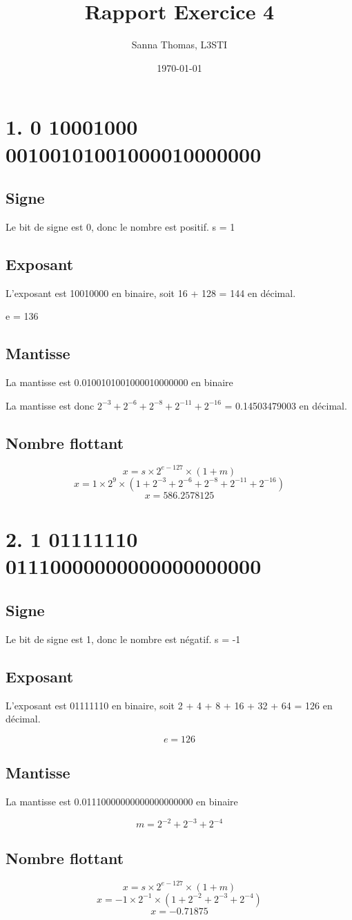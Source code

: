 \documentclass{article}
\title{Rapport Exercice 4}
\author{Sanna Thomas, L3STI}
\date{\today}
\begin{document}
\maketitle

\section*{1. 0 10001000 00100101001000010000000}
\subsection*{Signe}
Le bit de signe est 0, donc le nombre est positif.
s = 1

\subsection*{Exposant}
L'exposant est 10010000 en binaire, soit 16 + 128 = 144 en décimal. 

e = 136

\subsection*{Mantisse}
La mantisse est 0.0100101001000010000000 en binaire

La mantisse est donc $2^{-3} + 2^{-6} + 2^{-8} + 2^{-11} + 2^{-16}$ = 0.14503479003 en décimal.

\subsection*{Nombre flottant}

\[x = s \times 2^{e-127} \times (1+m) \]
\[ x = 1 \times 2^{9} \times (1+2^{-3} + 2^{-6} + 2^{-8} + 2^{-11} + 2^{-16})\]
\[ x = 586.2578125 \]


\break\section*{2. 1 01111110 01110000000000000000000}
\subsection*{Signe}
Le bit de signe est 1, donc le nombre est négatif.
s = -1

\subsection*{Exposant}
L'exposant est 01111110 en binaire, soit 2 + 4 + 8 + 16 + 32 + 64 = 126 en décimal. 

\[e = 126\]

\subsection*{Mantisse}
La mantisse est 0.01110000000000000000000 en binaire

\[ m = 2^{-2} + 2^{-3} + 2^{-4} \]

\subsection*{Nombre flottant}

\[x = s \times 2^{e-127} \times (1+m) \]
\[ x = -1 \times 2^{-1} \times (1+2^{-2} + 2^{-3} + 2^{-4})\]
\[ x = -0.71875 \]
\end{document}
